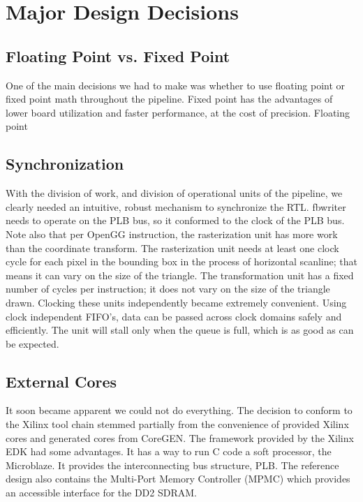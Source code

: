 \documentclass[letterpaper,10pt]{article}
\begin{document}
\section{Major Design Decisions}
\subsection{Floating Point vs. Fixed Point}
One of the main decisions we had to make was whether to use floating point or fixed point math throughout the pipeline. Fixed point has the advantages of lower board utilization and faster performance, at the cost of precision. Floating point 

\subsection{Synchronization}
With the division of work, and division of operational units of the pipeline, we clearly needed an intuitive, robust mechanism to synchronize the RTL.  fbwriter needs to operate on the PLB bus, so it conformed to the clock of the PLB bus.  Note also that per OpenGG instruction, the rasterization unit has more work than the coordinate transform.  The rasterization unit needs at least one clock cycle for each pixel in the bounding box in the process of horizontal scanline; that means it can vary on the size of the triangle.  The transformation unit has a fixed number of cycles per instruction; it does not vary on the size of the triangle drawn.  Clocking these units independently became extremely convenient.  Using clock independent FIFO's, data can be passed across clock domains safely and efficiently.  The unit will stall only when the queue is full, which is as good as can be expected.

\subsection{External Cores}
It soon became apparent we could not do everything. The decision to conform to the Xilinx tool chain stemmed partially from the convenience of provided Xilinx cores and generated cores from CoreGEN.  The framework provided by the Xilinx EDK had some advantages.  It has a way to run C code a soft processor, the Microblaze.  It provides the interconnecting bus structure, PLB.  The reference design also contains the Multi-Port Memory Controller (MPMC) which provides an accessible interface for the DD2 SDRAM.  
\end{document}
